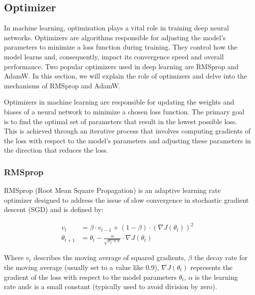 \newpage
\subsection{Optimizer}

In machine learning, optimization plays a vital role in training deep neural networks. Optimizers are algorithms responsible for adjusting the model's parameters to minimize a loss function during training. They control how the model learns and, consequently, impact its convergence speed and overall performance. Two popular optimizers used in deep learning are RMSprop and AdamW. In this section, we will explain the role of optimizers and delve into the mechanisms of RMSprop and AdamW.

Optimizers in machine learning are responsible for updating the weights and biases of a neural network to minimize a chosen loss function. The primary goal is to find the optimal set of parameters that result in the lowest possible loss. This is achieved through an iterative process that involves computing gradients of the loss with respect to the model's parameters and adjusting these parameters in the direction that reduces the loss.

\subsubsection{RMSprop}

RMSprop (Root Mean Square Propagation) is an adaptive learning rate optimizer designed to address the issue of slow convergence in stochastic gradient descent (SGD) and is defined by:


\begin{align}
	v_t &= \beta \cdot v_{t-1} + (1 - \beta) \cdot (\nabla J(\theta_t))^2 
	\\
	\theta_{t+1} &= \theta_t - \frac{\alpha}{\sqrt{v_t + \epsilon}} \cdot \nabla J(\theta_t)
\end{align}    

Where \(v_t\) describes the moving average of squared gradients, \(\beta\) the decay rate for the moving average (usually set to a value like 0.9), \(\nabla J(\theta_t)\) represents the gradient of the loss with respect to the model parameters \(\theta_t\), \(\alpha\) is the learning rate and\(\epsilon\) is a small constant (typically used to avoid division by zero).

